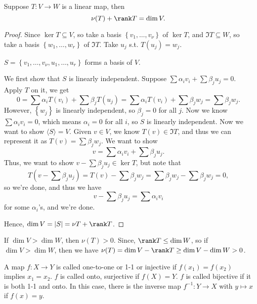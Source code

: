 \begin{theorem} \label{thm: rank and nullity theorem}
    Suppose \(T: V \to W\) is a linear map, then 
    \[
        \nu (T) + \rank T = \dim V.
    \] 
\end{theorem}
\begin{proof}
    Since \(\ker T \subseteq V\), so take a basis \(\left\{ v_1, \dots , v_{\nu} \right\} \) of \(\ker T\), and \(\Im T \subseteq W\), so take a basis \(\left\{ w_1, \dots , w_r \right\} \) of \(\Im T\). Take \(u_j\) s.t. \(T(u_j) = w_j\). 
    \begin{claim}
        \(S = \left\{ v_1, \dots , v_{\nu}, u_1, \dots , u_r \right\} \) forms a basis of \(V\).  
    \end{claim}   
    \begin{explanation}
        We first show that \(S\) is linearly independent. Suppose \(\sum \alpha _i v_i + \sum \beta_j u_j = 0 \). Apply \(T\) on it, we get
        \[
            0 = \sum \alpha _i T(v_i) + \sum \beta _j T(u_j) = \sum \alpha _i T(v_i) + \sum \beta _j w_j = \sum \beta _j w_j.   
        \]   However, \(\left\{ w_j \right\} \) is linearly independent, so \(\beta _j = 0\) for all \(j\). Now we know \(\sum \alpha _i v_i = 0 \), which means \(\alpha _i = 0\) for all \(i\), so \(S\) is linearly independent. Now we want to show \(\langle S \rangle = V \). Given \(v \in V\), we know \(T(v) \in \Im T\), and thus we can represent it as \(T(v) = \sum \beta _j w_j \). We want to show 
        \[
            v = \sum \alpha _i v_i + \sum \beta _j u_j.  
        \]    
        Thus, we want to show \(v - \sum \beta _j u_j \in \ker T \), but note that
        \[
            T \left( v - \sum \beta _j u_j  \right) = T(v) - \sum \beta _j w_j = \sum \beta _j w_j - \sum \beta _j w_j = 0,   
        \] so we're done, and thus we have 
        \[
            v - \sum \beta _j u_j = \sum \alpha _i v_i  
        \] for some \(\alpha _i\)'s, and we're done. 
    \end{explanation}    
    Hence, \(\dim V = \vert S \vert = \nu T + \rank T \). 
\end{proof}
\begin{remark} \label{rmk: dimV bigger than dimW then nuT bigger than 0}
    If \(\dim V > \dim W\), then \(\nu (T) > 0\). Since, \(\rank T \le \dim W\), so if \(\dim V > \dim W\), then we have \(\nu (T) = \dim V - \rank T \ge \dim V - \dim W > 0\).     
\end{remark}
\begin{prev}
    A map \(f: X \to  Y\) is called one-to-one or 1-1 or injective if \(f(x_1) = f(x_2)\) implies \(x_1 = x_2\). \(f\)  is called onto, surjective if \(f(X) = Y\). \(f\) is called bijective if it is both 1-1 and onto. In this case, there is the inverse map \(f^{-1}: Y \to X\) with \(y \mapsto x\) if \(f(x) = y\).   
\end{prev}
